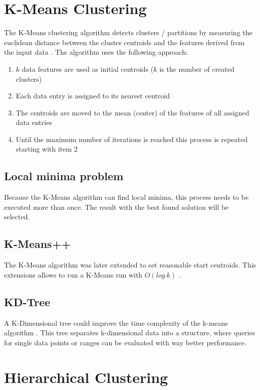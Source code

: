\section{K-Means Clustering}
\label{sec:K-Means}
The K-Means clustering algorithm detects clusters / partitions by measuring the euclidean distance between the cluster centroids and the features derived from the input data \cite{k-means++:2007}. The algorithm uses the following approach:

\begin{enumerate}
    \item $k$ data features are used as initial centroids ($k$ is the number of created clusters)
    \item Each data entry is assigned to its nearest centroid
    \item The centroids are moved to the mean (center) of the features of all assigned data entries
    \item Until the maximum number of iterations is reached this process is repeated starting with item 2
\end{enumerate}

\subsection{Local minima problem}
Because the K-Means algorithm can find local minima, this process needs to be executed more than once. The result with the best found solution will be selected.

\subsection{K-Means++} \label{sec:k-means++}
The K-Means algorithm was later extended to set reasonable start centroids. This extensions allows to run a K-Means run with $O(log\ k)$ \cite{k-means++:2007}.

\subsection{KD-Tree} \label{sec:k-means_KD-tree}
A K-Dimensional tree could improve the time complexity of the k-means algorithm \citep{kmeans:2002}. This tree separates k-dimensional data into a structure, where queries for single data points or ranges can be evaluated with way better performance.

\pagebreak
\FloatBarrier
\section{Hierarchical Clustering} \label{sec:hierarchicalClustering}


